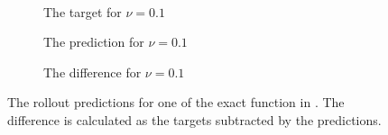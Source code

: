 \begin{figure}[H]
\begin{adjustwidth}{-0.1\linewidth}{-0.1\linewidth}
\begin{subfigure}{0.32\linewidth}
    \end{subfigure}
    \\[0.7\baselineskip]
    \begin{subfigure}{0.33\linewidth}
      \begin{adjustbox}{width=\linewidth}
        
      \end{adjustbox}
      \caption{The target for \(\nu=0.1\)}\label{fig:sc2_exact_target_0.1}
    \end{subfigure}
    \begin{subfigure}{0.33\linewidth}
      \begin{adjustbox}{width=\linewidth}
        
      \end{adjustbox}
      \caption{The prediction for \(\nu=0.1\)}\label{fig:sc2_exact_pred_0.1}
    \end{subfigure}
    \begin{subfigure}{0.32\linewidth}
      \begin{adjustbox}{width=\linewidth}
        
      \end{adjustbox}
      \caption{The difference for \(\nu=0.1\)}\label{fig:sc2_exact_diff_0.1}
    \end{subfigure}
  \end{adjustwidth}
  \caption{The rollout predictions for one of the exact function in . The difference is calculated as the targets subtracted by the predictions.}\label{fig:scenario_2_exact}
\end{figure}


